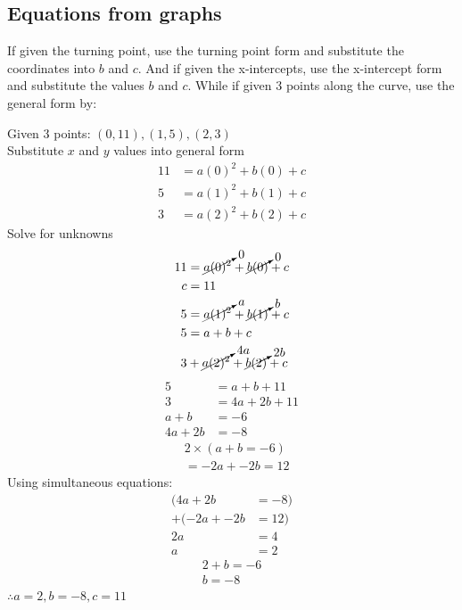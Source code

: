 \documentclass[a4paper,10pt]{report}
\begin{document}
\subsection{Equations from graphs}
If given the turning point, use the turning point form and substitute the coordinates into $b$ and $c$.  And if given the x-intercepts, use the x-intercept form and substitute the values $b$ and $c$.  While if given 3 points along the curve, use the general form by:\\
\begin{center}
	Given 3 points: $(0, 11), (1, 5), (2, 3)$\\
	Substitute $x$ and $y$ values into general form
	\begin{align*}
		11 & = a(0)^2 + b(0) + c \\
		5  & = a(1)^2 + b(1) + c \\
		3  & = a(2)^2 + b(2) + c
	\end{align*}
	Solve for unknowns
	\begin{align*}
		11 & = \cancelto{0}{a(0)^2} + \cancelto{0}{b(0)} + c   \\
		c  & = 11                                              \\
		5  & = \cancelto{a}{a(1)^2} + \cancelto{b}{b(1)} + c   \\
		5  & = a + b + c                                       \\
		3  & + \cancelto{4a}{a(2)^2} + \cancelto{2b}{b(2)} + c \\
	\end{align*}
	\begin{align*}
		5       & = a + b + 11   \\
		3       & = 4a + 2b + 11 \\
		a + b   & = -6           \\
		4a + 2b & = -8
	\end{align*}
	\begin{align*}
		 & 2 \times (a + b = -6) \\
		 & = -2a + -2b = 12
	\end{align*}
	Using simultaneous equations:
	\begin{align*}
		(4a + 2b     & = -8) \\
		+ (-2a + -2b & = 12) \\
		2a           & = 4   \\
		a            & = 2
	\end{align*}
	\begin{align*}
		2 + b = -6 \\
		b = -8
	\end{align*}
	$\therefore a = 2, b = -8, c = 11$
\end{center}
\end{document}
